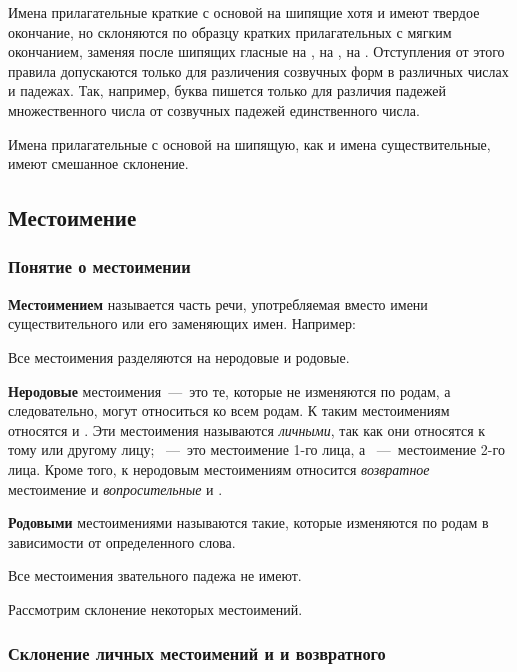 \documentclass[11pt,a4paper,oneside]{memoir}
\begin{document}
    Имена прилагательные краткие с основой на шипящие хотя и имеют твердое окончание, но склоняются по образцу кратких прилагательных с мягким окончанием, заменяя после шипящих {} гласные {} на {}, {} на {}, {} на {}. Отступления от этого правила допускаются только для различения созвучных форм в различных числах и падежах. Так, например, буква {} пишется только для различия падежей множественного числа от созвучных падежей единственного числа.
    
    Имена прилагательные с основой на шипящую, как и имена существительные, имеют смешанное склонение.


            \subsection{Местоимение}
                \subsubsection{Понятие о местоимении}

    \textbf{Местоимением} называется часть речи, употребляемая вместо имени существительного или его заменяющих имен. Например:
    
    \medskip{}

    Все местоимения разделяются на неродовые и родовые.
    
    \textbf{Неродовые} местоимения~---~это те, которые не изменяются по родам, а следовательно, могут относиться ко всем родам. К таким местоимениям относятся {} и {}. Эти местоимения называются \emph{личными}, так как они относятся к тому или другому лицу; {}~---~это местоимение 1-го лица, а {}~---~местоимение 2-го лица. Кроме того, к неродовым местоимениям относится \emph{возвратное} местоимение {} и \emph{вопросительные} {} и {}.
    
    \textbf{Родовыми} местоимениями называются такие, которые изменяются по родам в зависимости от определенного слова.
    
    Все местоимения звательного падежа не имеют.
    
    Рассмотрим склонение некоторых местоимений.

                \subsubsection{Склонение личных местоимений {} и {} и возвратного {}}
    
\end{document}

